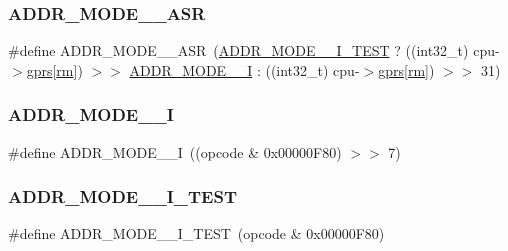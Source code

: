 \subsubsection{\texorpdfstring{A\+D\+D\+R\+\_\+\+M\+O\+D\+E\+\_\+\_\+\+A\+SR}{ADDR\_MODE\_2\_ASR}}
{\footnotesize\ttfamily \#define A\+D\+D\+R\+\_\+\+M\+O\+D\+E\+\_\+\_\+\+A\+SR~(\mbox{\hyperlink{isa-arm_8c_aaeae2827f85b4a89e95d7136db35a6f1}{A\+D\+D\+R\+\_\+\+M\+O\+D\+E\+\_\+\_\+\+I\+\_\+\+T\+E\+ST}} ? ((int32\+\_\+t) cpu-\/$>$\mbox{\hyperlink{isa-thumb_8c_a6b4b7e13a9a144391615b217c5917bc7}{gprs}}\mbox{[}\mbox{\hyperlink{isa-thumb_8c_a20e40d2fb8c51fa4dd2b4449ad32e111}{rm}}\mbox{]}) $>$$>$ \mbox{\hyperlink{isa-arm_8c_aab74ad6dee8d6e1d4037dad7928b3514}{A\+D\+D\+R\+\_\+\+M\+O\+D\+E\+\_\+\_\+I}} \+: ((int32\+\_\+t) cpu-\/$>$\mbox{\hyperlink{isa-thumb_8c_a6b4b7e13a9a144391615b217c5917bc7}{gprs}}\mbox{[}\mbox{\hyperlink{isa-thumb_8c_a20e40d2fb8c51fa4dd2b4449ad32e111}{rm}}\mbox{]}) $>$$>$ 31)}

\mbox{\label{isa-arm_8c_aab74ad6dee8d6e1d4037dad7928b3514}} 
\subsubsection{\texorpdfstring{A\+D\+D\+R\+\_\+\+M\+O\+D\+E\+\_\+\_\+I}{ADDR\_MODE\_2\_I}}
{\footnotesize\ttfamily \#define A\+D\+D\+R\+\_\+\+M\+O\+D\+E\+\_\+\_\+I~((opcode \& 0x00000\+F80) $>$$>$ 7)}

\mbox{\label{isa-arm_8c_aaeae2827f85b4a89e95d7136db35a6f1}} 
\subsubsection{\texorpdfstring{A\+D\+D\+R\+\_\+\+M\+O\+D\+E\+\_\+\_\+\+I\+\_\+\+T\+E\+ST}{ADDR\_MODE\_2\_I\_TEST}}
{\footnotesize\ttfamily \#define A\+D\+D\+R\+\_\+\+M\+O\+D\+E\+\_\+\_\+\+I\+\_\+\+T\+E\+ST~(opcode \& 0x00000\+F80)}

